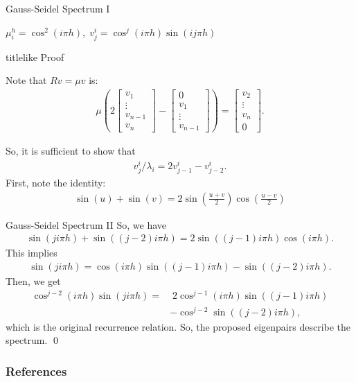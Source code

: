 \documentclass{beamer}
\begin{document}
\begin{frame}[label=gaussSeidelProof]{Gauss-Seidel Spectrum I}
 \begin{theorem}
  $\mu_i^h = \cos^2(i\pi h), \; v_j^i = \cos^j(i\pi h)\sin(ij\pi h)$
 \end{theorem}
  \begin{beamercolorbox}{titlelike}
   Proof
  \end{beamercolorbox}
  
  Note that $Rv=\mu v$ is:
  \begin{align}
   \mu\left(2 \begin{bmatrix}v_1\\ \vdots \\ v_{n-1} \\ v_n \end{bmatrix} - \begin{bmatrix} 0 \\ v_1 \\ \vdots \\ v_{n-1} \end{bmatrix} \right) = \begin{bmatrix}v_2\\ \vdots \\ v_n \\ 0\end{bmatrix}.
  \end{align}

  So, it is sufficient to show that
  \begin{align}
   v_j^i/\lambda_i = 2v_{j-1}^i - v_{j-2}^i. \nonumber
  \end{align}
  First, note the identity:
  \begin{align}
   \sin(u)+\sin(v) = 2\sin\left(\frac{u+v}{2}\right)\cos\left(\frac{u-v}{2}\right) \nonumber
  \end{align}
\end{frame}
\begin{frame}{Gauss-Seidel Spectrum II}
  So, we have
  \begin{align}
   \sin(ji\pi h) + \sin((j-2)i\pi h) = 2 \sin\left( (j-1)i\pi h \right) \cos\left( i\pi h \right). \nonumber
  \end{align}
  This implies
  \begin{align}
   \sin(ji\pi h) = \cos(i \pi h) \sin((j-1)i\pi h) - \sin((j-2)i\pi h). \nonumber
  \end{align}
  Then, we get
  \begin{align}
   \cos^{j-2}(i\pi h)\sin(ji\pi h) =& \; 2\cos^{j-1}(i \pi h) \sin((j-1)i\pi h) \nonumber \\
                                      &- \cos^{j-2}\sin((j-2)i\pi h), \nonumber
  \end{align}
  which is the original recurrence relation.
  So, the proposed eigenpairs describe the spectrum.
  \qed \\
  \hyperlink{gaussSeidel}{}
\end{frame}

\begin{frame}[allowframebreaks]
 \frametitle{References}
 
 
\end{frame}
\end{document}
